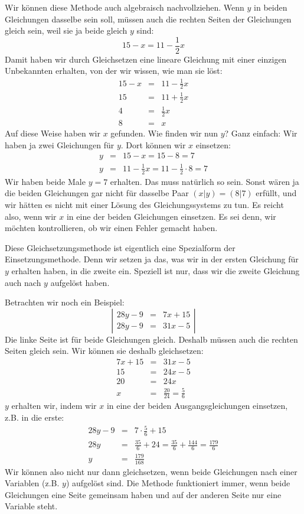 \documentclass[%
11pt,%
twoside,%
titlepage,%
german,%
]{scrartcl}
\newenvironment{system}{\begin{displaymath}
  \left| 
    \begin{array}{rcl}}{\end{array} \right| 
\end{displaymath}}
\begin{document}
Wir k\"onnen diese Methode auch algebraisch nachvollziehen. Wenn $y$ in beiden Gleichungen dasselbe sein soll, m\"ussen auch die rechten Seiten der Gleichungen gleich sein, weil sie ja beide gleich $y$ sind:
\begin{displaymath}
  15-x = 11-\frac{1}{2}x
\end{displaymath}
Damit haben wir durch Gleichsetzen eine lineare Gleichung mit einer einzigen Unbekannten erhalten, von der wir wissen, wie man sie l\"ost:
\begin{eqnarray*}
  15-x & = & 11-\frac{1}{2}x \\
  15 & = & 11 + \frac{1}{2}x \\
  4 & = & \frac{1}{2}x \\
  8 & = & x
\end{eqnarray*}
Auf diese Weise haben wir $x$ gefunden. Wie finden wir nun $y$? Ganz einfach: Wir haben ja zwei Gleichungen f\"ur $y$. Dort k\"onnen wir $x$ einsetzen:
\begin{eqnarray*}
  y & = & 15-x = 15-8 = 7 \\
  y & = & 11-\frac{1}{2}x = 11-\frac{1}{2}\cdot 8 =7
\end{eqnarray*}
Wir haben beide Male $y=7$ erhalten. Das muss nat\"urlich so sein. Sonst w\"aren ja die beiden Gleichungen gar nicht f\"ur dasselbe Paar $(x|y)=(8|7)$ erf\"ullt, und wir h\"atten es nicht mit einer L\"osung des Gleichungssystems zu tun. Es reicht also, wenn wir $x$ in eine der beiden Gleichungen einsetzen. Es sei denn, wir m\"ochten kontrollieren, ob wir einen Fehler gemacht haben.

Diese Gleichsetzungsmethode ist eigentlich eine Spezialform der Einsetzungsmethode. Denn wir setzen ja das, was wir in der ersten Gleichung f\"ur $y$ erhalten haben, in die zweite ein. Speziell ist nur, dass wir die zweite Gleichung auch nach $y$ aufgel\"ost haben.

Betrachten wir noch ein Beispiel:
\begin{system}
  28y-9 & = & 7x+15 \\
  28y-9 & = & 31x-5
\end{system}Die linke Seite ist f\"ur beide Gleichungen gleich. Deshalb m\"ussen auch die rechten Seiten gleich sein. Wir k\"onnen sie deshalb gleichsetzen:
\begin{eqnarray*}
  7x+15 & = & 31x-5 \\
  15 & = & 24x - 5 \\
  20 & = & 24x \\
  x & = & \frac{20}{24}=\frac{5}{6}
\end{eqnarray*}
$y$ erhalten wir, indem wir $x$ in eine der beiden Ausgangsgleichungen einsetzen, z.B. in die erste:
\begin{eqnarray*}
  28y-9 & = & 7\cdot\frac{5}{6}+15 \\
  28y & = & \frac{35}{6} + 24 = \frac{35}{6}+\frac{144}{6} = \frac{179}{6} \\
  y & = & \frac{179}{168}
\end{eqnarray*}
Wir k\"onnen also nicht nur dann gleichsetzen, wenn beide Gleichungen nach einer Variablen (z.B. $y$) aufgel\"ost sind. Die Methode funktioniert immer, wenn beide Gleichungen eine Seite gemeinsam haben und auf der anderen Seite nur eine Variable steht.
\end{document}
